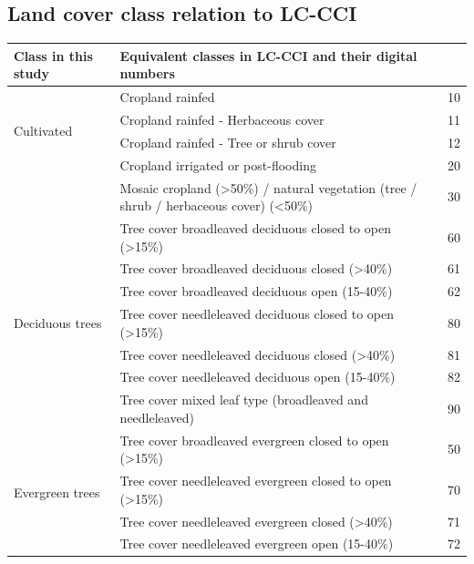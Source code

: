 \documentclass[a4paper,12pt]{scrbook}
\begin{document}
\begin{appendices}
 \chapter{Land cover class relation to LC-CCI}
 \label{appendix-classes}
 \begin{table}[!ht]
  \begin{center}
    \begin{adjustbox}{totalheight=\baselineskip}
      \begin{tabular}{lp{10.5cm}l}
	\hline
	Class in this study & Equivalent classes in LC-CCI and their digital numbers & \\
	\hline
	\multirow{4}{*}{Cultivated} & Cropland rainfed & 10 \\
	  & Cropland rainfed - Herbaceous cover & 11 \\
	  & Cropland rainfed - Tree or shrub cover & 12 \\
	  & Cropland irrigated or post-flooding & 20 \\
	  & Mosaic cropland (>50\%) / natural vegetation (tree / shrub / herbaceous cover) (<50\%) & 30 \\
	\hline
	\multirow{7}{*}{Deciduous trees} & Tree cover  broadleaved  deciduous  closed to open (>15\%) & 60 \\
	  & Tree cover  broadleaved  deciduous  closed (>40\%) & 61 \\
	  & Tree cover  broadleaved  deciduous  open (15-40\%) & 62 \\
	  & Tree cover  needleleaved  deciduous  closed to open (>15\%) & 80 \\
	  & Tree cover  needleleaved  deciduous  closed (>40\%) & 81 \\
	  & Tree cover  needleleaved  deciduous  open (15-40\%) & 82 \\
	  & Tree cover  mixed leaf type (broadleaved and needleleaved) & 90 \\
	\hline
	\multirow{4}{*}{Evergreen trees} & Tree cover broadleaved evergreen closed to open (>15\%) & 50 \\
	  & Tree cover  needleleaved  evergreen  closed to open (>15\%) & 70 \\
	  & Tree cover  needleleaved  evergreen  closed (>40\%) & 71 \\
	  & Tree cover  needleleaved  evergreen  open (15-40\%) & 72 \\

\end{tabular}
\end{adjustbox}
\end{center}
\end{table}
\end{appendices}
\end{document}
